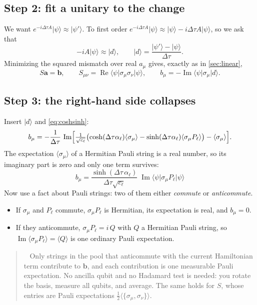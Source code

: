 \documentclass[11pt,a4paper]{article}
\newcommand{\ket}[1]{\lvert #1\rangle}
\newcommand{\bra}[1]{\langle #1\rvert}
\newcommand{\ex}[1]{\langle #1\rangle}
\newcommand{\Rea}{\operatorname{Re}}
\newcommand{\Ima}{\operatorname{Im}}
\newcommand{\dt}{\Delta\tau}
\newenvironment{idea}[1][Main idea]{\par\smallskip\begin{quotation}\noindent{\bfseries\textcolor{keyblue}{#1.}}\ }{\end{quotation}\smallskip}
\begin{document}
\subsection*{Step 2: fit a unitary to the change}
We want $e^{-i\dt A}\ket\psi\approx\ket{\psi'}$. To first order $e^{-i\dt A}\ket\psi\approx\ket\psi-i\dt A\ket\psi$, so we ask that
\[
-iA\ket\psi\approx\ket d,\qquad \ket d=\frac{\ket{\psi'}-\ket\psi}{\dt}.
\]
Minimizing the squared mismatch over real $a_\mu$ gives, exactly as in \cref{sec:linear},
\begin{equation}\label{eq:perterm-sys}
S\bm a=\bm b,\qquad S_{\mu\nu}=\Rea\bra\psi\sigma_\mu\sigma_\nu\ket\psi,\qquad b_\mu=-\Ima\bra\psi\sigma_\mu\ket d .
\end{equation}

\subsection*{Step 3: the right-hand side collapses}
Insert $\ket d$ and \cref{eq:coshsinh}:
\[
b_\mu=-\frac1{\dt}\,\Ima\Bigl[\tfrac1{\sqrt{c_\ell}}\bigl(\cosh(\dt\alpha_\ell)\ex{\sigma_\mu}-\sinh(\dt\alpha_\ell)\ex{\sigma_\mu P_\ell}\bigr)-\ex{\sigma_\mu}\Bigr].
\]
The expectation $\ex{\sigma_\mu}$ of a Hermitian Pauli string is a real number, so its imaginary part is zero and only one term survives:
\begin{equation}\label{eq:b-simple}
\boxed{\,b_\mu=\frac{\sinh(\dt\,\alpha_\ell)}{\dt\sqrt{c_\ell}}\;\Ima\bra\psi\sigma_\mu P_\ell\ket\psi\,}
\end{equation}
Now use a fact about Pauli strings: two of them either \emph{commute} or \emph{anticommute}.
\begin{itemize}
\item If $\sigma_\mu$ and $P_\ell$ commute, $\sigma_\mu P_\ell$ is Hermitian, its expectation is real, and $b_\mu=0$.
\item If they anticommute, $\sigma_\mu P_\ell=i\,Q$ with $Q$ a Hermitian Pauli string, so $\Ima\ex{\sigma_\mu P_\ell}=\ex{Q}$ is one ordinary Pauli expectation.
\end{itemize}
\begin{idea}[What this means on a device]
Only strings in the pool that anticommute with the current Hamiltonian term contribute to $\bm b$, and each contribution is one measurable Pauli expectation. No ancilla qubit and no Hadamard test is needed: you rotate the basis, measure all qubits, and average. The same holds for $S$, whose entries are Pauli expectations $\tfrac12\ex{\{\sigma_\mu,\sigma_\nu\}}$.
\end{idea}
\end{document}
